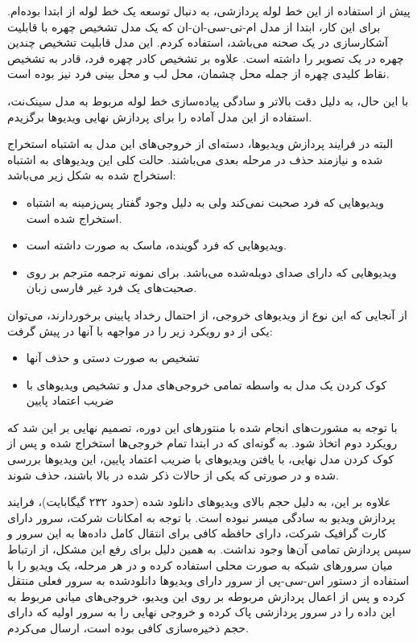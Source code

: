 پیش از استفاده از این خط لوله پردازشی، به دنبال توسعه یک خط لوله از ابتدا بوده‌ام. برای این کار، ابتدا از مدل ام-تی-سی-ان-ان
که یک مدل تشخیص چهره با قابلیت آشکارسازی در یک صحنه
می‌باشد، استفاده کردم. این مدل قابلیت تشخیص چندین چهره در یک تصویر را داشته است. علاوه بر تشخیص کادر چهره فرد، قادر به تشخیص نقاط کلیدی چهره از جمله محل چشمان، محل لب و محل بینی فرد نیز بوده است.

با این حال، به دلیل دقت بالاتر و سادگی پیاده‌سازی خط لوله مربوط به مدل سینک‌نت، استفاده از این مدل آماده را برای پردازش نهایی ویدیو‌ها برگزیدم.

البته در فرایند پردازش ویدیو‌ها، دسته‌ای از خروجی‌های این مدل به اشتباه استخراج شده و نیازمند حذف در مرحله بعدی می‌باشند. حالت کلی این ویدیو‌های به اشتباه استخراج شده به شکل زیر می‌باشد:

\begin{itemize}
	\item ویدیو‌هایی که فرد صحبت نمی‌کند ولی به دلیل وجود گفتار پس‌زمینه به اشتباه استخراج شده است.
	\item ویدیو‌هایی که فرد گوینده، ماسک به صورت داشته است.
	\item ویدیو‌هایی که دارای صدای دوبله‌شده می‌باشد. برای نمونه ترجمه مترجم بر روی صحبت‌های یک فرد غیر فارسی زبان.
\end{itemize}

از آنجایی که این نوع از ویدیو‌های خروجی، از احتمال رخداد پایینی برخوردارند، می‌توان یکی از دو رویکرد زیر را در مواجهه با آنها در پیش گرفت:

\begin{itemize}
	\item تشخیص به صورت دستی و حذف آنها
	\item کوک کردن یک مدل به واسطه تمامی خروجی‌های مدل و تشخیص ویدیو‌های با ضریب اعتماد پایین
\end{itemize}

با توجه به مشورت‌های انجام شده با منتور‌های این دوره، تصمیم نهایی بر این شد که رویکرد دوم اتخاذ شود. به گونه‌ای که در ابتدا تمام خروجی‌ها استخراج شده و پس از کوک کردن مدل نهایی، با یافتن ویدیو‌های با ضریب اعتماد پایین، این ویدیو‌ها بررسی شده و در صورتی که یکی از حالات ذکر شده در بالا باشند، حذف شوند.

علاوه بر این، به دلیل حجم بالای ویدیو‌های دانلود شده (حدود ۲۳۲ گیگابایت)، فرایند پردازش ویدیو به سادگی میسر نبوده است. با توجه به امکانات شرکت، سرور
دارای کارت گرافیک
شرکت، دارای حافظه کافی برای انتقال کامل داده‌ها به این سرور و سپس پردازش تمامی آن‌ها وجود نداشت. به همین دلیل برای رفع این مشکل، از ارتباط میان سرور‌های شبکه به صورت محلی استفاده کرده و در هر مرحله، یک ویدیو را با استفاده از دستور اس-سی-پی
از سرور دارای ویدیو‌ها دانلود‌شده به سرور فعلی منتقل کرده و پس از اعمال پردازش مربوطه بر روی این ویدیو، خروجی‌های میانی مربوط به این داده را در سرور پردازشی پاک کرده و خروجی نهایی را به سرور اولیه که دارای حجم ذخیره‌سازی کافی بوده است، ارسال می‌کردم. 

